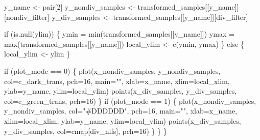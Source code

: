 \documentclass[
  letterpaper,
  DIV=11,
  numbers=noendperiod]{scrartcl}
\newenvironment{Shaded}{\begin{snugshade}}{\end{snugshade}}
\newcommand{\BuiltInTok}[1]{\textcolor[rgb]{0.00,0.23,0.31}{#1}}
\newcommand{\ControlFlowTok}[1]{\textcolor[rgb]{0.00,0.23,0.31}{#1}}
\newcommand{\DecValTok}[1]{\textcolor[rgb]{0.68,0.00,0.00}{#1}}
\newcommand{\KeywordTok}[1]{\textcolor[rgb]{0.00,0.23,0.31}{#1}}
\newcommand{\NormalTok}[1]{\textcolor[rgb]{0.00,0.23,0.31}{#1}}
\newcommand{\OperatorTok}[1]{\textcolor[rgb]{0.37,0.37,0.37}{#1}}
\newcommand{\StringTok}[1]{\textcolor[rgb]{0.13,0.47,0.30}{#1}}
\begin{document}
\begin{Shaded}
\begin{Highlighting}[]
\NormalTok{    y\_name }\OperatorTok{\textless{}{-}}\NormalTok{ pair[}\DecValTok{2}\NormalTok{]}
\NormalTok{    y\_nondiv\_samples }\OperatorTok{\textless{}{-}}\NormalTok{ transformed\_samples[[y\_name]][nondiv\_filter]}
\NormalTok{    y\_div\_samples    }\OperatorTok{\textless{}{-}}\NormalTok{ transformed\_samples[[y\_name]][div\_filter]}
    
    \ControlFlowTok{if}\NormalTok{ (}\KeywordTok{is}\NormalTok{.null(ylim)) \{}
\NormalTok{      ymin }\OperatorTok{=} \BuiltInTok{min}\NormalTok{(transformed\_samples[[y\_name]])}
\NormalTok{      ymax }\OperatorTok{=} \BuiltInTok{max}\NormalTok{(transformed\_samples[[y\_name]])}
\NormalTok{      local\_ylim }\OperatorTok{\textless{}{-}}\NormalTok{ c(ymin, ymax)}
\NormalTok{    \} }\ControlFlowTok{else}\NormalTok{ \{}
\NormalTok{      local\_ylim }\OperatorTok{\textless{}{-}}\NormalTok{ ylim}
\NormalTok{    \}}
 
    \ControlFlowTok{if}\NormalTok{ (plot\_mode }\OperatorTok{==} \DecValTok{0}\NormalTok{) \{}
\NormalTok{      plot(x\_nondiv\_samples, y\_nondiv\_samples,}
\NormalTok{           col}\OperatorTok{=}\NormalTok{c\_dark\_trans, pch}\OperatorTok{=}\DecValTok{16}\NormalTok{, main}\OperatorTok{=}\StringTok{""}\NormalTok{,}
\NormalTok{           xlab}\OperatorTok{=}\NormalTok{x\_name, xlim}\OperatorTok{=}\NormalTok{local\_xlim, }
\NormalTok{           ylab}\OperatorTok{=}\NormalTok{y\_name, ylim}\OperatorTok{=}\NormalTok{local\_ylim)}
\NormalTok{      points(x\_div\_samples, y\_div\_samples,}
\NormalTok{             col}\OperatorTok{=}\NormalTok{c\_green\_trans, pch}\OperatorTok{=}\DecValTok{16}\NormalTok{)}
\NormalTok{    \}}
    \ControlFlowTok{if}\NormalTok{ (plot\_mode }\OperatorTok{==} \DecValTok{1}\NormalTok{) \{}
\NormalTok{      plot(x\_nondiv\_samples, y\_nondiv\_samples,}
\NormalTok{           col}\OperatorTok{=}\StringTok{"\#DDDDDD"}\NormalTok{, pch}\OperatorTok{=}\DecValTok{16}\NormalTok{, main}\OperatorTok{=}\StringTok{""}\NormalTok{,}
\NormalTok{           xlab}\OperatorTok{=}\NormalTok{x\_name, xlim}\OperatorTok{=}\NormalTok{local\_xlim, }
\NormalTok{           ylab}\OperatorTok{=}\NormalTok{y\_name, ylim}\OperatorTok{=}\NormalTok{local\_ylim)}
\NormalTok{      points(x\_div\_samples, y\_div\_samples,}
\NormalTok{             col}\OperatorTok{=}\NormalTok{cmap[div\_nlfs], pch}\OperatorTok{=}\DecValTok{16}\NormalTok{)}
\NormalTok{    \}}
\NormalTok{  \}}
\NormalTok{\}}
\end{Highlighting}
\end{Shaded}
\end{document}
